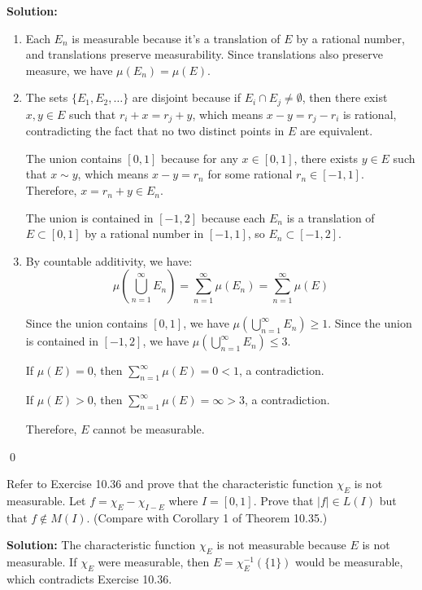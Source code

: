 \bigskip\noindent\textbf{Solution:}
\begin{enumerate}[label=(\alph*)]
    \item Each $E_n$ is measurable because it's a translation of $E$ by a rational number, and translations preserve measurability. Since translations also preserve measure, we have $\mu(E_n) = \mu(E)$.
    
    \item The sets $\{E_1, E_2, \ldots \}$ are disjoint because if $E_i \cap E_j \neq \emptyset$, then there exist $x, y \in E$ such that $r_i + x = r_j + y$, which means $x - y = r_j - r_i$ is rational, contradicting the fact that no two distinct points in $E$ are equivalent.
    
    The union contains $[0, 1]$ because for any $x \in [0, 1]$, there exists $y \in E$ such that $x \sim y$, which means $x - y = r_n$ for some rational $r_n \in [-1, 1]$. Therefore, $x = r_n + y \in E_n$.
    
    The union is contained in $[-1, 2]$ because each $E_n$ is a translation of $E \subset [0, 1]$ by a rational number in $[-1, 1]$, so $E_n \subset [-1, 2]$.
    
    \item By countable additivity, we have:
    \[\mu\left(\bigcup_{n=1}^{\infty} E_n\right) = \sum_{n=1}^{\infty} \mu(E_n) = \sum_{n=1}^{\infty} \mu(E)\]
    
    Since the union contains $[0, 1]$, we have $\mu(\bigcup_{n=1}^{\infty} E_n) \geq 1$. Since the union is contained in $[-1, 2]$, we have $\mu(\bigcup_{n=1}^{\infty} E_n) \leq 3$.
    
    If $\mu(E) = 0$, then $\sum_{n=1}^{\infty} \mu(E) = 0 < 1$, a contradiction.
    
    If $\mu(E) > 0$, then $\sum_{n=1}^{\infty} \mu(E) = \infty > 3$, a contradiction.
    
    Therefore, $E$ cannot be measurable.
\end{enumerate}\qed


\begin{problembox}
Refer to Exercise 10.36 and prove that the characteristic function $\chi_E$ is not measurable. Let $f = \chi_E - \chi_{I-E}$ where $I = [0, 1]$. Prove that $|f| \in L(I)$ but that $f \notin M(I)$. (Compare with Corollary 1 of Theorem 10.35.)
\end{problembox}

\bigskip\noindent\textbf{Solution:}
The characteristic function $\chi_E$ is not measurable because $E$ is not measurable. If $\chi_E$ were measurable, then $E = \chi_E^{-1}(\{1\})$ would be measurable, which contradicts Exercise 10.36.

